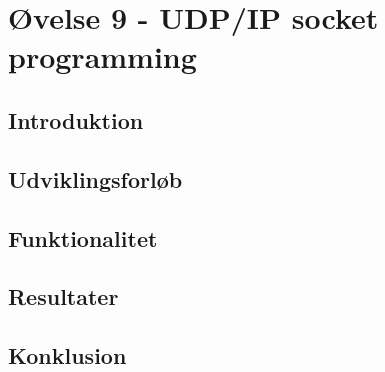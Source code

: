 \section{Øvelse 9 - UDP/IP socket programming}

\subsection{Introduktion}

\subsection{Udviklingsforløb}

\subsection{Funktionalitet}

\subsection{Resultater}

\subsection{Konklusion}
